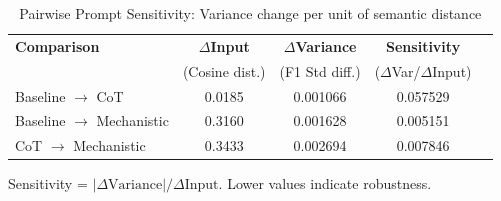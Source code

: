 \begin{table}[htbp]
\centreing
\caption{Pairwise Prompt Sensitivity: Variance change per unit of semantic distance}
\label{tab:pairwise_sensitivity}
\begin{tabular}{lcccc}
\toprule
\textbf{Comparison} & \textbf{$\Delta$Input} & \textbf{$\Delta$Variance} & \textbf{Sensitivity} \\
 & (Cosine dist.) & (F1 Std diff.) & ($\Delta$Var/$\Delta$Input) \\
\midrule
Baseline $\rightarrow$ CoT & 0.0185 & 0.001066 & 0.057529 \\
Baseline $\rightarrow$ Mechanistic & 0.3160 & 0.001628 & 0.005151 \\
CoT $\rightarrow$ Mechanistic & 0.3433 & 0.002694 & 0.007846 \\
\bottomrule
\end{tabular}
\begin{tablenotes}
\small
\item Sensitivity = $|\Delta\text{Variance}| / \Delta\text{Input}$. Lower values indicate robustness.
\end{tablenotes}
\end{table}